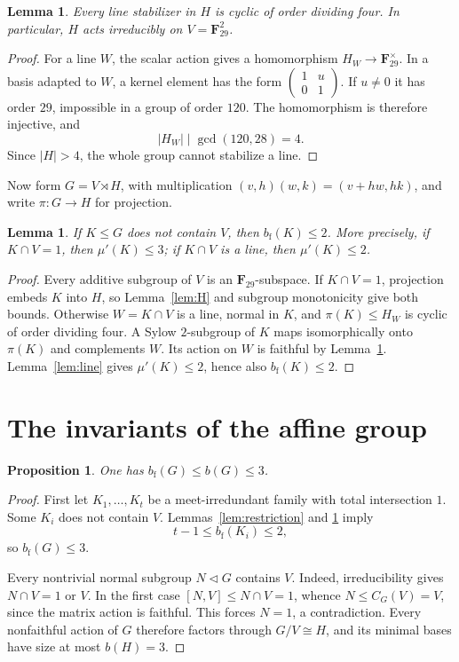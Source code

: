 \IfFileExists{baustms.cls}{\bulletinformattrue\documentclass[plain]{baustms}}{\bulletinformatfalse\documentclass[11pt]{amsart}}
\theoremstyle{cupthm}
\newtheorem{proposition}[theorem]{Proposition}
\newtheorem{lemma}[theorem]{Lemma}
\newcommand{\F}{\mathbf F}
\newcommand{\mup}{\mu'}
\newcommand{\bfth}{b_{\mathrm f}}
\begin{document}
\begin{lemma}\label{lem:stabilizers}
Every line stabilizer in $H$ is cyclic of order dividing four.
In particular, $H$ acts irreducibly on $V=\F_{29}^2$.
\end{lemma}
\begin{proof}
For a line $W$, the scalar action gives a homomorphism
$H_W\to\F_{29}^\times$. In a basis adapted to $W$, a kernel element
has the form $\left(\begin{smallmatrix}1&u\\0&1\end{smallmatrix}\right)$.
If $u\ne0$ it has order $29$, impossible in a group of order $120$.
The homomorphism is therefore injective, and
\[
 |H_W|\mid\gcd(120,28)=4.
\]
Since $|H|>4$, the whole group cannot stabilize a line.
\end{proof}

Now form $G=V\rtimes H$, with multiplication
$(v,h)(w,k)=(v+hw,hk)$, and write $\pi:G\to H$ for projection.

\begin{lemma}\label{lem:properV}
If $K\le G$ does not contain $V$, then $\bfth(K)\le2$.
More precisely, if $K\cap V=1$, then $\mup(K)\le3$;
if $K\cap V$ is a line, then $\mup(K)\le2$.
\end{lemma}
\begin{proof}
Every additive subgroup of $V$ is an $\F_{29}$-subspace.
If $K\cap V=1$, projection embeds $K$ into $H$, so
Lemma~\ref{lem:H} and subgroup monotonicity give both bounds.
Otherwise $W=K\cap V$ is a line, normal in $K$, and
$\pi(K)\le H_W$ is cyclic of order dividing four.
A Sylow $2$-subgroup of $K$ maps isomorphically onto $\pi(K)$
and complements $W$. Its action on $W$ is faithful by
Lemma~\ref{lem:stabilizers}. Lemma~\ref{lem:line} gives
$\mup(K)\le2$, hence also $\bfth(K)\le2$.
\end{proof}

\section{The invariants of the affine group}
\begin{proposition}\label{prop:upper}
One has $\bfth(G)\le b(G)\le3$.
\end{proposition}
\begin{proof}
First let $K_1,\ldots,K_t$ be a meet-irredundant family with total
intersection $1$. Some $K_i$ does not contain $V$.
Lemmas~\ref{lem:restriction} and \ref{lem:properV} imply
\[
 t-1\le\bfth(K_i)\le2,
\]
so $\bfth(G)\le3$.

Every nontrivial normal subgroup $N\lhd G$ contains $V$.
Indeed, irreducibility gives $N\cap V=1$ or $V$.
In the first case $[N,V]\le N\cap V=1$, whence
$N\le C_G(V)=V$, since the matrix action is faithful.
This forces $N=1$, a contradiction. Every nonfaithful action of $G$
therefore factors through $G/V\cong H$, and its minimal bases have
size at most $b(H)=3$.
\end{proof}
\end{document}
